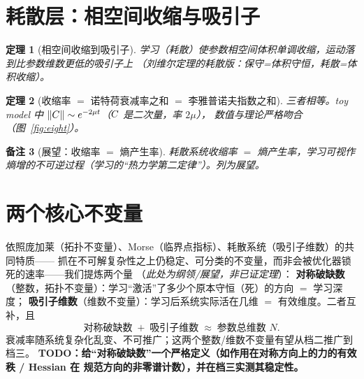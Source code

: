 \documentclass[11pt]{article}
\newtheorem{Theorem}{定理}[section]
\newtheorem{Remark}[Theorem]{备注}
\begin{document}
\section{耗散层：相空间收缩与吸引子}\label{sec:dissipative}
\begin{Theorem}[相空间收缩到吸引子]\label{thm:contract}
学习（耗散）使参数相空间体积单调收缩，运动落到比参数维数更低的吸引子上
（刘维尔定理的耗散版：保守=体积守恒，耗散=体积收缩）。
\end{Theorem}

\begin{Theorem}[收缩率 $=$ 诺特荷衰减率之和 $=$ 李雅普诺夫指数之和]\label{thm:rate}
三者相等。toy model 中 $\left\lVert C \right\rVert\sim e^{-2\mu t}$（$C$ 是二次量，率 $2\mu$），
数值与理论严格吻合（图~\ref{fig:eight}）。
\end{Theorem}

\begin{Remark}[展望：收缩率 $=$ 熵产生率]
耗散系统收缩率 $=$ 熵产生率，学习可视作熵增的不可逆过程（学习的“热力学第二定律”）。列为展望。
\end{Remark}

\section{两个核心不变量}\label{sec:invariants}
依照庞加莱（拓扑不变量）、Morse（临界点指标）、耗散系统（吸引子维数）的共同特质——
抓在不可解复杂性之上仍稳定、可分类的不变量，而非会被优化器锁死的速率——我们提炼两个量
（\emph{此处为纲领/展望，非已证定理}）：
\textbf{对称破缺数}（整数，拓扑不变量）：学习“激活”了多少个原本守恒（死）的方向 $=$ 学习深度；
\textbf{吸引子维数}（维数不变量）：学习后系统实际活在几维 $=$ 有效维度。二者互补，且
\begin{equation}\label{eq:invariants}
  \text{对称破缺数} \;+\; \text{吸引子维数} \;\approx\; \text{参数总维数 } N.
\end{equation}
衰减率随系统复杂化乱变、不可推广；这两个整数/维数不变量有望从档二推广到档三。
\textbf{TODO：给“对称破缺数”一个严格定义（如作用在对称方向上的力的有效秩 / Hessian 在
规范方向的非零谱计数），并在档三实测其稳定性。}
\end{document}
